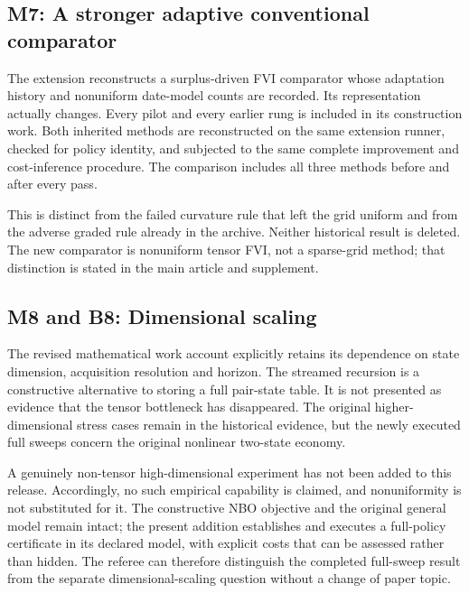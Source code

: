 \documentclass[ecta,nameyear,draft]{econsocart}
\begin{document}
\hypertarget{m7-a-stronger-adaptive-conventional-comparator}{%
\subsection{M7: A stronger adaptive conventional
comparator}\label{m7-a-stronger-adaptive-conventional-comparator}}

The extension reconstructs a surplus-driven FVI comparator whose
adaptation history and nonuniform date-model counts are recorded. Its
representation actually changes. Every pilot and every earlier rung is
included in its construction work. Both inherited methods are
reconstructed on the same extension runner, checked for policy identity,
and subjected to the same complete improvement and cost-inference
procedure. The comparison includes all three methods before and after
every pass.

This is distinct from the failed curvature rule that left the grid
uniform and from the adverse graded rule already in the archive. Neither
historical result is deleted. The new comparator is nonuniform tensor
FVI, not a sparse-grid method; that distinction is stated in the main
article and supplement.

\hypertarget{m8-and-b8-dimensional-scaling}{%
\subsection{M8 and B8: Dimensional
scaling}\label{m8-and-b8-dimensional-scaling}}

The revised mathematical work account explicitly retains its dependence
on state dimension, acquisition resolution and horizon. The streamed
recursion is a constructive alternative to storing a full pair-state
table. It is not presented as evidence that the tensor bottleneck has
disappeared. The original higher-dimensional stress cases remain in the
historical evidence, but the newly executed full sweeps concern the
original nonlinear two-state economy.

A genuinely non-tensor high-dimensional experiment has not been added to
this release. Accordingly, no such empirical capability is claimed, and
nonuniformity is not substituted for it. The constructive NBO objective
and the original general model remain intact; the present addition
establishes and executes a full-policy certificate in its declared
model, with explicit costs that can be assessed rather than hidden. The
referee can therefore distinguish the completed full-sweep result from
the separate dimensional-scaling question without a change of paper
topic.
\end{document}
